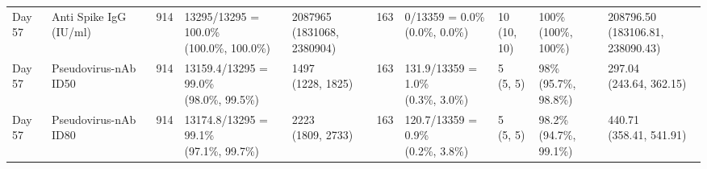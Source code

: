 \documentclass[]{book}
\theoremstyle{definition}
\theoremstyle{definition}
\theoremstyle{definition}
\newcommand{\1}{\mathbbm{1}}
\begin{document}
\begin{landscape}
\begin{ThreePartTable}
\begin{longtable}[t]{>{\raggedright\arraybackslash}p{1cm}lllllllll}
\addlinespace
Day 57 & Anti Spike IgG (IU/ml) & 914 & \makecell[l]{13295/13295 = 100.0\%\\(100.0\%, 100.0\%)} & \makecell[l]{2087965\\(1831068, 2380904)} & 163 & \makecell[l]{0/13359 = 0.0\%\\(0.0\%, 0.0\%)} & \makecell[l]{10\\(10, 10)} & \makecell[l]{100\%\\(100\%, 100\%)} & \makecell[l]{208796.50\\(183106.81, 238090.43)}\\
Day 57 & Pseudovirus-nAb ID50 & 914 & \makecell[l]{13159.4/13295 = 99.0\%\\(98.0\%, 99.5\%)} & \makecell[l]{1497\\(1228, 1825)} & 163 & \makecell[l]{131.9/13359 = 1.0\%\\(0.3\%, 3.0\%)} & \makecell[l]{5\\(5, 5)} & \makecell[l]{98\%\\(95.7\%, 98.8\%)} & \makecell[l]{297.04\\(243.64, 362.15)}\\
Day 57 & Pseudovirus-nAb ID80 & 914 & \makecell[l]{13174.8/13295 = 99.1\%\\(97.1\%, 99.7\%)} & \makecell[l]{2223\\(1809, 2733)} & 163 & \makecell[l]{120.7/13359 = 0.9\%\\(0.2\%, 3.8\%)} & \makecell[l]{5\\(5, 5)} & \makecell[l]{98.2\%\\(94.7\%, 99.1\%)} & \makecell[l]{440.71\\(358.41, 541.91)}\\*
\end{longtable}
\end{ThreePartTable}


\clearpage


\end{landscape}
\end{document}
